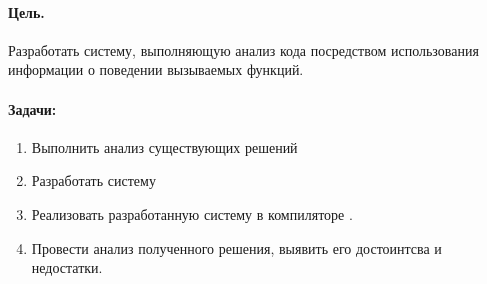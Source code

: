 \paragraph{Цель.} Разработать систему, выполняющую анализ кода посредством использования информации о поведении вызываемых функций.

\paragraph{Задачи:}

\begin{enumerate}
	\item Выполнить анализ существующих решений
	
	\item Разработать систему
	
	\item Реализовать разработанную систему в компиляторе .
	
	\item Провести анализ полученного решения, выявить его достоинтсва и недостатки.
\end{enumerate}